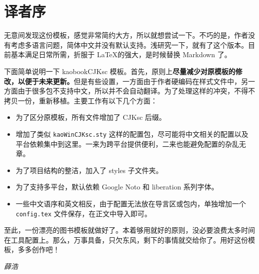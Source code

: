 \chapter*{译者序} %

无意间发现这份模板，感觉非常简约大方，所以就想尝试一下。不巧的是，作者没有考虑多语言问题，简体中文并没有默认支持。浅研究一下，就有了这个版本。目前基本满足日常所需，折服于 \LaTeX 的强大，是时候替换 Markdown 了。

下面简单说明一下 kaobookCJKsc 模板。首先，原则上\textbf{尽量减少对原模板的修改，以便于未来更新。}但是有些设置，一方面由于作者硬编码在样式文件中，另一方面由于很多包不支持中文，所以并不会自动翻译。为了处理这样的冲突，不得不拷贝一份，重新移植。主要工作有以下几个方面：

\begin{itemize}
    \item 为了区分原模板，所有文件增加了 CJKsc 后缀。
    \item 增加了类似 \texttt{kaoWinCJKsc.sty} 这样的配置包，尽可能将中文相关的配置以及平台依赖集中到这里。一来为跨平台提供便利，二来也能避免配置的杂乱无章。
    \item 为了项目结构的整洁，加入了 styles 子文件夹。
    \item 为了支持多平台，默认依赖 Google Noto 和 liberation 系列字体。
    \item 一些中文语序和英文相反，由于配置无法放在导言区或包内，单独增加一个 \texttt{config.tex} 文件保存，在正文中导入即可。
\end{itemize}

至此，一份漂亮的图书模板就做好了。本着够用就好的原则，没必要浪费太多时间在工具配置上。那么，万事具备，只欠东风，剩下的事情就交给你了。用好这份模板，多多创作吧！

\begin{flushright}
	\textit{薛浩}\hspace*{2.5em}

    \textit{\zhtoday}
\end{flushright}

